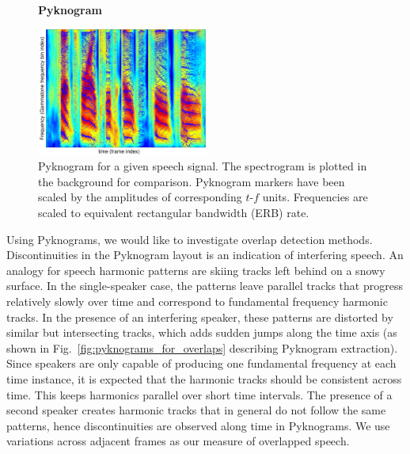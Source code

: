 {\begin{figure}[h!]
	\centering
	\vspace{4mm}
	\textbf{Pyknogram}\par\medskip
	\includegraphics[height =2.in, width=0.5\textwidth]{figures/pyknogram_vs_spectrogram}
	\vspace{-1mm}
	\caption{Pyknogram for a given speech signal. The spectrogram is plotted in the background for comparison. Pyknogram markers have been scaled by the amplitudes of corresponding $t$-$f$ units. Frequencies are scaled to equivalent rectangular bandwidth (ERB) rate.}
	\vspace{-1mm}
	\label{fig:pyknograms}
\end{figure}

Using Pyknograms, we would like to investigate overlap detection methods.
Discontinuities in the Pyknogram layout is an indication of interfering speech. 
An analogy for speech harmonic patterns are skiing tracks left behind on a snowy surface. 
In the single-speaker case, the patterns leave parallel tracks that progress relatively slowly over time and correspond to fundamental frequency harmonic tracks. 
In the presence of an interfering speaker, these patterns are distorted by similar but intersecting tracks, which adds sudden jumps along the time axis (as shown in Fig.~\ref{fig:pyknograms_for_overlaps} describing Pyknogram extraction). 
Since speakers are only capable of producing one fundamental frequency at each time instance, it is expected that the harmonic tracks should be consistent across time. 
This keeps harmonics parallel over short time intervals.   
The presence of a second speaker creates harmonic tracks that in general do not follow the same patterns, hence discontinuities are observed along time in Pyknograms. We use variations across adjacent frames as our measure of overlapped speech.

}
